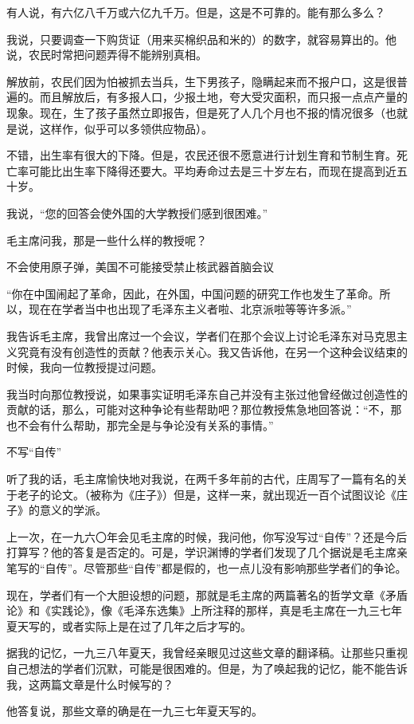 有人说，有六亿八千万或六亿九千万。但是，这是不可靠的。能有那么多么？

我说，只要调查一下购货证（用来买棉织品和米的）的数字，就容易算出的。他说，农民时常把问题弄得不能辨别真相。

解放前，农民们因为怕被抓去当兵，生下男孩子，隐瞒起来而不报户口，这是很普遍的。而且解放后，有多报人口，少报土地，夸大受灾面积，而只报一点点产量的现象。现在，生了孩子虽然立即报告，但是死了人几个月也不报的情况很多（也就是说，这样作，似乎可以多领供应物品）。

不错，出生率有很大的下降。但是，农民还很不愿意进行计划生育和节制生育。死亡率可能比出生率下降得还要大。平均寿命过去是三十岁左右，而现在提高到近五十岁。

我说，“您的回答会使外国的大学教授们感到很困难。”

毛主席问我，那是一些什么样的教授呢？

不会使用原子弹，美国不可能接受禁止核武器首脑会议

“你在中国闹起了革命，因此，在外国，中国问题的研究工作也发生了革命。所以，现在在学者当中也出现了毛泽东主义者啦、北京派啦等等许多派。”

我告诉毛主席，我曾出席过一个会议，学者们在那个会议上讨论毛泽东对马克思主义究竟有没有创造性的贡献？他表示关心。我又告诉他，在另一个这种会议结束的时候，我向一位教授提过问题。

我当时向那位教授说，如果事实证明毛泽东自己并没有主张过他曾经做过创造性的贡献的话，那么，可能对这种争论有些帮助吧？那位教授焦急地回答说：“不，那也不会有什么帮助，那完全是与争论没有关系的事情。”

不写“自传”

听了我的话，毛主席愉快地对我说，在两千多年前的古代，庄周写了一篇有名的关于老子的论文。（被称为《庄子》）但是，这样一来，就出现近一百个试图议论《庄子》的意义的学派。

上一次，在一九六〇年会见毛主席的时候，我问他，你写没写过“自传”？还是今后打算写？他的答复是否定的。可是，学识渊博的学者们发现了几个据说是毛主席亲笔写的“自传”。尽管那些“自传”都是假的，也一点儿没有影响那些学者们的争论。

现在，学者们有一个大胆设想的问题，那就是毛主席的两篇著名的哲学文章《矛盾论》和《实践论》，像《毛泽东选集》上所注释的那样，真是毛主席在一九三七年夏天写的，或者实际上是在过了几年之后才写的。

据我的记忆，一九三八年夏天，我曾经亲眼见过这些文章的翻译稿。让那些只重视自己想法的学者们沉默，可能是很困难的。但是，为了唤起我的记忆，能不能告诉我，这两篇文章是什么时候写的？

他答复说，那些文章的确是在一九三七年夏天写的。

